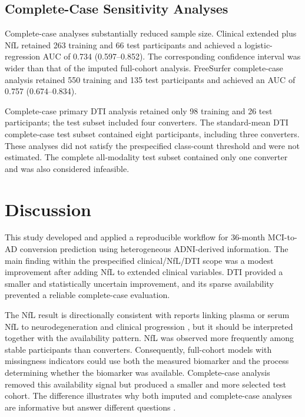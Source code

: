 \documentclass[preprint,12pt]{elsarticle}
\begin{document}
\subsection{Complete-Case Sensitivity Analyses}

Complete-case analyses substantially reduced sample size. Clinical extended plus NfL retained 263 training and 66 test participants and achieved a logistic-regression AUC of 0.734 (0.597--0.852). The corresponding confidence interval was wider than that of the imputed full-cohort analysis. FreeSurfer complete-case analysis retained 550 training and 135 test participants and achieved an AUC of 0.757 (0.674--0.834).



Complete-case primary DTI analysis retained only 98 training and 26 test participants; the test subset included four converters. The standard-mean DTI complete-case test subset contained eight participants, including three converters. These analyses did not satisfy the prespecified class-count threshold and were not estimated. The complete all-modality test subset contained only one converter and was also considered infeasible.

\section{Discussion}
\label{sec:discussion}

This study developed and applied a reproducible workflow for 36-month MCI-to-AD conversion prediction using heterogeneous ADNI-derived information. The main finding within the prespecified clinical/NfL/DTI scope was a modest improvement after adding NfL to extended clinical variables. DTI provided a smaller and statistically uncertain improvement, and its sparse availability prevented a reliable complete-case evaluation.

The NfL result is directionally consistent with reports linking plasma or serum NfL to neurodegeneration and clinical progression \cite{mattssonAssociationPlasmaNeurofilament2017,lewczukPlasmaNeurofilamentLight2018,preischeSerumNeurofilamentDynamics2019}, but it should be interpreted together with the availability pattern. NfL was observed more frequently among stable participants than converters. Consequently, full-cohort models with missingness indicators could use both the measured biomarker and the process determining whether the biomarker was available. Complete-case analysis removed this availability signal but produced a smaller and more selected test cohort. The difference illustrates why both imputed and complete-case analyses are informative but answer different questions \cite{Little2019,austinMissingDataClinical2021}.
\end{document}
